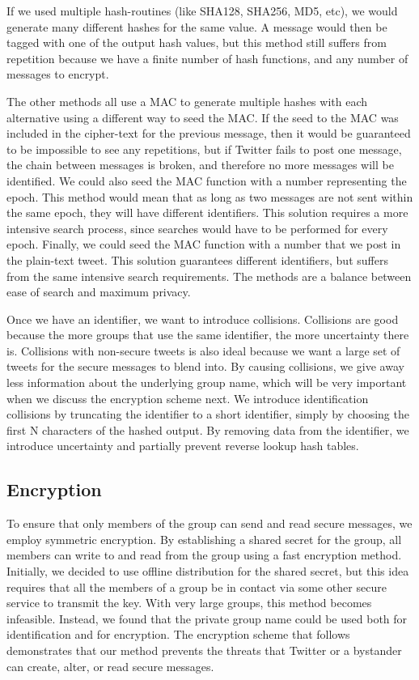 \documentclass{article}
\begin{document}
If we used multiple hash-routines (like SHA128, SHA256, MD5, etc), we would generate many different hashes for the same value. A message would then be tagged with one of the output hash values, but this method still suffers from repetition because we have a finite number of hash functions, and any number of messages to encrypt.

The other methods all use a MAC to generate multiple hashes with each alternative using a different way to seed the MAC. If the seed to the MAC was included in the cipher-text for the previous message, then it would be guaranteed to be impossible to see any repetitions, but if Twitter fails to post one message, the chain between messages is broken, and therefore no more messages will be identified. We could also seed the MAC function with a number representing the epoch. This method would mean that as long as two messages are not sent within the same epoch, they will have different identifiers. This solution requires a more intensive search process, since searches would have to be performed for every epoch. Finally, we could seed the MAC function with a number that we post in the plain-text tweet. This solution guarantees different identifiers, but suffers from the same intensive search requirements. The methods are a balance between ease of search and maximum privacy. 

Once we have an identifier, we want to introduce collisions. Collisions are good because the more groups that use the same identifier, the more uncertainty there is. Collisions with non-secure tweets is also ideal because we want a large  set of tweets for the secure messages to blend into. By causing collisions, we give away less information about the underlying group name, which will be very important when we discuss the encryption scheme next. We introduce identification collisions by truncating the identifier to a short identifier, simply by choosing the first N characters of the hashed output. By removing data from the identifier, we introduce uncertainty and partially prevent reverse lookup hash tables.

\subsection*{Encryption}

To ensure that only members of the group can send and read secure messages, we employ symmetric encryption. By establishing a shared secret for the group, all members can write to and read from the group using a fast encryption method. Initially, we decided to use offline distribution for the shared secret, but this idea requires that all the members of a group be in contact via some other secure service to transmit the key. With very large groups, this method becomes infeasible. Instead, we found that the private group name could be used both for identification and for encryption. The encryption scheme that follows demonstrates that our method prevents the threats that Twitter or a bystander can create, alter, or read secure messages.
\end{document}
